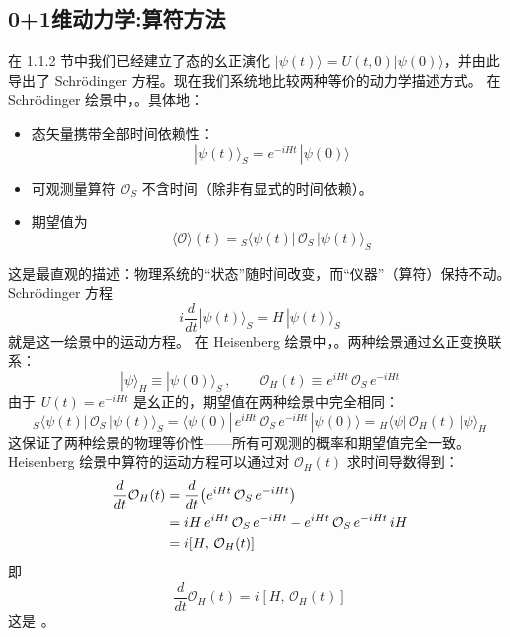 \subsection{0+1维动力学:算符方法}
在 1.1.2 节中我们已经建立了态的幺正演化 $|\psi(t)\rangle = U(t,0)|\psi(0)\rangle$，并由此导出了 Schr\"{o}dinger 方程。现在我们系统地比较两种等价的动力学描述方式。
在 Schr\"{o}dinger 绘景中，。具体地：
\begin{itemize}
\item 态矢量携带全部时间依赖性：
\begin{equation}
|\psi(t)\rangle_S = e^{-iHt}\,|\psi(0)\rangle
\end{equation}
\item 可观测量算符 $\mathcal{O}_S$ 不含时间（除非有显式的时间依赖）。
\item 期望值为
\begin{equation}
\langle \mathcal{O} \rangle(t)
= {}_S\langle\psi(t)|\,\mathcal{O}_S\,|\psi(t)\rangle_S
\end{equation}
\end{itemize}
这是最直观的描述：物理系统的``状态''随时间改变，而``仪器''（算符）保持不动。Schr\"{o}dinger 方程
\begin{equation}
i\frac{d}{dt}|\psi(t)\rangle_S = H\,|\psi(t)\rangle_S
\end{equation}
就是这一绘景中的运动方程。
在 Heisenberg 绘景中，。两种绘景通过幺正变换联系：
\begin{equation}
|\psi\rangle_H \equiv |\psi(0)\rangle_S\,,\qquad
\mathcal{O}_H(t) \equiv e^{iHt}\,\mathcal{O}_S\,e^{-iHt}
\end{equation}
由于 $U(t)=e^{-iHt}$ 是幺正的，期望值在两种绘景中完全相同：
\begin{equation}
{}_S\langle\psi(t)|\,\mathcal{O}_S\,|\psi(t)\rangle_S
= \langle\psi(0)|\,e^{iHt}\,\mathcal{O}_S\,e^{-iHt}\,|\psi(0)\rangle
= {}_H\langle\psi|\,\mathcal{O}_H(t)\,|\psi\rangle_H
\end{equation}
这保证了两种绘景的物理等价性——\color{blue}所有可观测的概率和期望值完全一致。\normalcolor Heisenberg 绘景中算符的运动方程可以通过对 $\mathcal{O}_H(t)$ 求时间导数得到：
\begin{align}
\frac{d}{dt}\mathcal{O}_H(t)
&= \frac{d}{dt}\bigl(e^{iHt}\,\mathcal{O}_S\,e^{-iHt}\bigr) \notag\\
&= iH\,e^{iHt}\,\mathcal{O}_S\,e^{-iHt}
- e^{iHt}\,\mathcal{O}_S\,e^{-iHt}\,iH \notag\\
&= i[H,\,\mathcal{O}_H(t)]
\end{align}
即
\begin{equation}
\frac{d}{dt}\mathcal{O}_H(t) = i[H,\,\mathcal{O}_H(t)]
\end{equation}
这是 。

